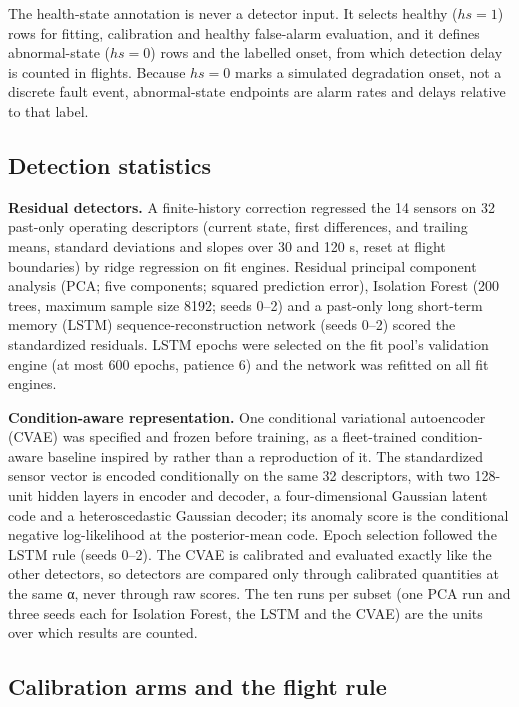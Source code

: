 \documentclass[preprint,11pt,a4paper]{elsarticle}
\begin{document}
The health-state annotation is never a detector input. It selects healthy ($hs = 1$) rows for fitting, calibration and healthy false-alarm evaluation, and it defines abnormal-state ($hs = 0$) rows and the labelled onset, from which detection delay is counted in flights. Because $hs = 0$ marks a simulated degradation onset, not a discrete fault event, abnormal-state endpoints are alarm rates and delays relative to that label.

\subsection{Detection statistics}

\textbf{Residual detectors.} A finite-history correction regressed the 14 sensors on 32 past-only operating descriptors (current state, first differences, and trailing means, standard deviations and slopes over 30 and 120 s, reset at flight boundaries) by ridge regression on fit engines. Residual principal component analysis (PCA; five components; squared prediction error), Isolation Forest (200 trees, maximum sample size 8192; seeds 0–2) and a past-only long short-term memory (LSTM) sequence-reconstruction network (seeds 0–2) scored the standardized residuals. LSTM epochs were selected on the fit pool's validation engine (at most 600 epochs, patience 6) and the network was refitted on all fit engines.

\textbf{Condition-aware representation.} One conditional variational autoencoder (CVAE) was specified and frozen before training, as a fleet-trained condition-aware baseline inspired by \cite{N38} rather than a reproduction of it. The standardized sensor vector is encoded conditionally on the same 32 descriptors, with two 128-unit hidden layers in encoder and decoder, a four-dimensional Gaussian latent code and a heteroscedastic Gaussian decoder; its anomaly score is the conditional negative log-likelihood at the posterior-mean code. Epoch selection followed the LSTM rule (seeds 0–2). The CVAE is calibrated and evaluated exactly like the other detectors, so detectors are compared only through calibrated quantities at the same α, never through raw scores. The ten runs per subset (one PCA run and three seeds each for Isolation Forest, the LSTM and the CVAE) are the units over which results are counted.

\subsection{Calibration arms and the flight rule}
\end{document}
